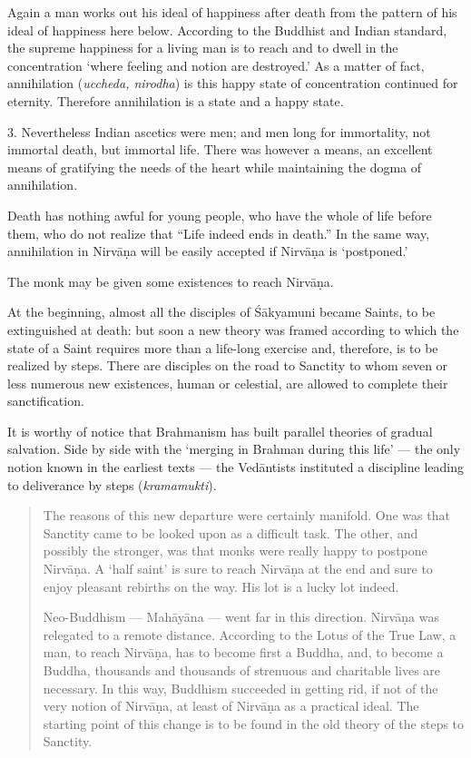 \documentclass[a4paper, 11pt, oneside, english, landscape]{article}
\begin{document}
Again a man works out his ideal of happiness after death from the pattern of his ideal of happiness here below. According to the Buddhist and Indian standard, the supreme happiness for a living man is to reach and to dwell in the concentration `where feeling and notion are destroyed.' As a matter of fact, annihilation (\emph{uccheda, nirodha}) is this happy state of concentration continued for eternity. Therefore annihilation is a state and a happy state.

3. Nevertheless Indian ascetics were men; and men long for immortality, not immortal death, but immortal life. There was however a means, an excellent means of gratifying the needs of the heart while maintaining the dogma of annihilation.

Death has nothing awful for young people, who have the whole of life before them, who do not realize that ``Life indeed ends in death.'' In the same way, annihilation in Nirvāṇa will be easily accepted if Nirvāṇa is `postponed.'

The monk may be given some existences to reach Nirvāṇa.

At the beginning, almost all the disciples of Śākyamuni became Saints, to be extinguished at death: but soon a new theory was framed according to which the state of a Saint requires more than a life-long exercise and, therefore, is to be realized by steps. There are disciples on the road to Sanctity to whom seven or less numerous new existences, human or celestial, are allowed to complete their sanctification.

It is worthy of notice that Brahmanism has built parallel theories of gradual salvation. Side by side with the `merging in Brahman during this life' --- the only notion known in the earliest texts --- the Vedāntists instituted a discipline leading to deliverance by steps (\emph{kramamukti}).
\begin{quotation}
\small
The reasons of this new departure were certainly manifold. One was that Sanctity came to be looked upon as a difficult task. The other, and possibly the stronger, was that monks were really happy to postpone Nirvāṇa. A `half saint' is sure to reach Nirvāṇa at the end and sure to enjoy pleasant rebirths on the way. His lot is a lucky lot indeed.

Neo-Buddhism --- Mahāyāna --- went far in this direction. Nirvāṇa was relegated to a remote distance. According to the Lotus of the True Law, a man, to reach Nirvāṇa, has to become first a Buddha, and, to become a Buddha, thousands and thousands of strenuous and charitable lives are necessary. In this way, Buddhism succeeded in getting rid, if not of the very notion of Nirvāṇa, at least of Nirvāṇa as a practical ideal. The starting point of this change is to be found in the old theory of the steps to Sanctity.
\end{quotation}
\end{document}
